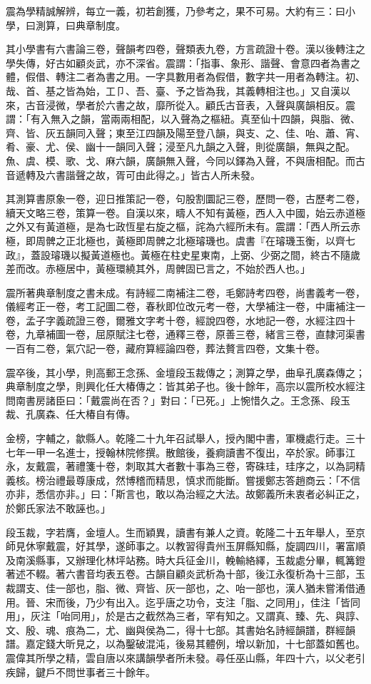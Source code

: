\begin{pinyinscope}
震為學精誠解辨，每立一義，初若創獲，乃參考之，果不可易。大約有三：曰小學，曰測算，曰典章制度。

其小學書有六書論三卷，聲韻考四卷，聲類表九卷，方言疏證十卷。漢以後轉注之學失傳，好古如顧炎武，亦不深省。震謂：「指事、象形、諧聲、會意四者為書之體，假借、轉注二者為書之用。一字具數用者為假借，數字共一用者為轉注。初、哉、首、基之皆為始，工⼙、吾、臺、予之皆為我，其義轉相注也。」又自漢以來，古音浸微，學者於六書之故，靡所從入。顧氏古音表，入聲與廣韻相反。震謂：「有入無入之韻，當兩兩相配，以入聲為之樞紐。真至仙十四韻，與脂、微、齊、皆、灰五韻同入聲；東至江四韻及陽至登八韻，與支、之、佳、咍、蕭、宵、肴、豪、尤、侯、幽十一韻同入聲；浸至凡九韻之入聲，則從廣韻，無與之配。魚、虞、模、歌、戈、麻六韻，廣韻無入聲，今同以鐸為入聲，不與唐相配。而古音遞轉及六書諧聲之故，胥可由此得之。」皆古人所未發。

其測算書原象一卷，迎日推策記一卷，句股割圜記三卷，歷問一卷，古歷考二卷，續天文略三卷，策算一卷。自漢以來，疇人不知有黃極，西人入中國，始云赤道極之外又有黃道極，是為七政恆星右旋之樞，詫為六經所未有。震謂：「西人所云赤極，即周髀之正北極也，黃極即周髀之北極璿璣也。虞書『在璿璣玉衡，以齊七政』，蓋設璿璣以擬黃道極也。黃極在柱史星東南，上弼、少弼之間，終古不隨歲差而改。赤極居中，黃極環繞其外，周髀固已言之，不始於西人也。」

震所著典章制度之書未成。有詩經二南補注二卷，毛鄭詩考四卷，尚書義考一卷，儀經考正一卷，考工記圖二卷，春秋即位改元考一卷，大學補注一卷，中庸補注一卷，孟子字義疏證三卷，爾雅文字考十卷，經說四卷，水地記一卷，水經注四十卷，九章補圖一卷，屈原賦注七卷，通釋三卷，原善三卷，緒言三卷，直隸河渠書一百有二卷，氣穴記一卷，藏府算經論四卷，葬法贅言四卷，文集十卷。

震卒後，其小學，則高郵王念孫、金壇段玉裁傳之；測算之學，曲阜孔廣森傳之；典章制度之學，則興化任大椿傳之：皆其弟子也。後十餘年，高宗以震所校水經注問南書房諸臣曰：「戴震尚在否？」對曰：「已死。」上惋惜久之。王念孫、段玉裁、孔廣森、任大椿自有傳。

金榜，字輔之，歙縣人。乾隆二十九年召試舉人，授內閣中書，軍機處行走。三十七年一甲一名進士，授翰林院修撰。散館後，養痾讀書不復出，卒於家。師事江永，友戴震，著禮箋十卷，刺取其大者數十事為三卷，寄硃珪，珪序之，以為詞精義核。榜治禮最尊康成，然博稽而精思，慎求而能斷。嘗援鄭志答趙商云：「不信亦非，悉信亦非。」曰：「斯言也，敢以為治經之大法。故鄭義所未衷者必糾正之，於鄭氏家法不敢誣也。」

段玉裁，字若膺，金壇人。生而穎異，讀書有兼人之資。乾隆二十五年舉人，至京師見休寧戴震，好其學，遂師事之。以教習得貴州玉屏縣知縣，旋調四川，署富順及南溪縣事，又辦理化林坪站務。時大兵征金川，輓輸絡繹，玉裁處分畢，輒篝鐙著述不輟。著六書音均表五卷。古韻自顧炎武析為十部，後江永復析為十三部，玉裁謂支、佳一部也，脂、微、齊皆、灰一部也，之、咍一部也，漢人猶未嘗淆借通用。晉、宋而後，乃少有出入。迄乎唐之功令，支注「脂、之同用」，佳注「皆同用」，灰注「咍同用」，於是古之截然為三者，罕有知之。又謂真、臻、先、與諄、文、殷、魂、痕為二，尤、幽與侯為二，得十七部。其書始名詩經韻譜，群經韻譜。嘉定錢大昕見之，以為鑿破混沌，後易其體例，增以新加，十七部蓋如舊也。震偉其所學之精，雲自唐以來講韻學者所未發。尋任巫山縣，年四十六，以父老引疾歸，鍵戶不問世事者三十餘年。


\end{pinyinscope}
